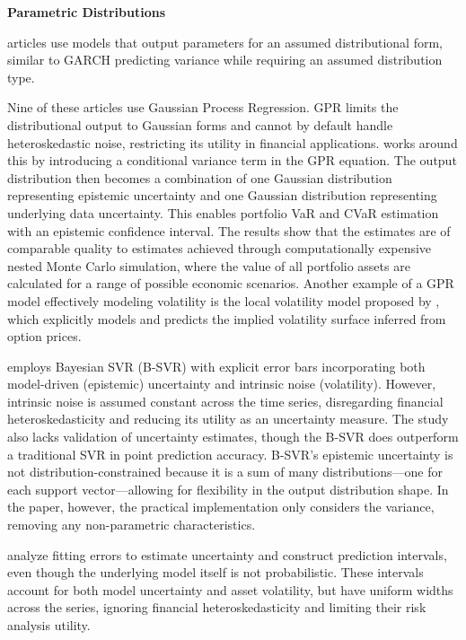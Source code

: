 \textbf{Parametric Distributions}

\distributionalparametric articles use models that output parameters for an assumed distributional form, similar to GARCH predicting variance while requiring an assumed distribution type.

Nine of these articles use Gaussian Process Regression. GPR limits the distributional output to Gaussian forms and cannot by default handle heteroskedastic noise, restricting its utility in financial applications. \textcite{Risk2018gpr} works around this by introducing a conditional variance term in the GPR equation. The output distribution then becomes a combination of one Gaussian distribution representing epistemic uncertainty and one Gaussian distribution representing underlying data uncertainty. This enables portfolio VaR and CVaR estimation with an epistemic confidence interval. The results show that the estimates are of comparable quality to estimates achieved through computationally expensive nested Monte Carlo simulation, where the value of all portfolio assets are calculated for a range of possible economic scenarios. Another example of a GPR model effectively modeling volatility is the local volatility model proposed by \textcite{tegner2021probabilistic}, which explicitly models and predicts the implied volatility surface inferred from option prices.

\textcite{Law2017Practical} employs Bayesian SVR (B-SVR) with explicit error bars incorporating both model-driven (epistemic) uncertainty and intrinsic noise (volatility). However, intrinsic noise is assumed constant across the time series, disregarding financial heteroskedasticity and reducing its utility as an uncertainty measure. The study also lacks validation of uncertainty estimates, though the B-SVR does outperform a traditional SVR in point prediction accuracy. B-SVR's epistemic uncertainty is not distribution-constrained because it is a sum of many distributions—one for each support vector—allowing for flexibility in the output distribution shape. In the paper, however, the practical implementation only considers the variance, removing any non-parametric characteristics.

\textcite{Tian2023} analyze fitting errors to estimate uncertainty and construct prediction intervals, even though the underlying model itself is not probabilistic. These intervals account for both model uncertainty and asset volatility, but have uniform widths across the series, ignoring financial heteroskedasticity and limiting their risk analysis utility.

